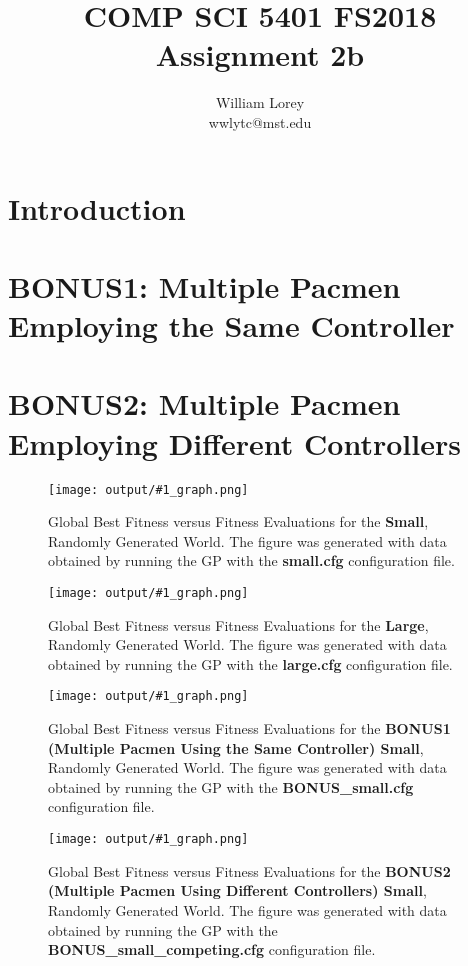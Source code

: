 \documentclass[11pt]{article}
\title{COMP SCI 5401 FS2018 Assignment 2b}
\author{William  Lorey \\ wwlytc@mst.edu}
\date{}
\newcommand{\fitnessplotcaption}[2]{\caption{Global Best Fitness versus Fitness Evaluations for the \textbf{{#1}}, Randomly Generated World. The figure was generated with data obtained by running the GP with the \textbf{{#2}} configuration file.}}
\newcommand{\addgraphic}[1]{\centerline{\texttt{[image: output/\#1\_graph.png]}}}
\begin{document}
\maketitle

\tableofcontents

\section{Introduction}

\section{BONUS1: Multiple Pacmen Employing the Same Controller}

\section{BONUS2: Multiple Pacmen Employing Different Controllers}

\begin{figure}[H]
    \addgraphic{small}
    \fitnessplotcaption{Small}{small.cfg}
    \label{fig:small}
\end{figure}

\begin{figure}[H]
    \addgraphic{large}
    \fitnessplotcaption{Large}{large.cfg}
    \label{fig:med_small}
\end{figure}

\begin{figure}[H]
    \addgraphic{BONUS_small}
    \fitnessplotcaption{BONUS1 (Multiple Pacmen Using the Same Controller) Small}{BONUS\_small.cfg}
    \label{fig:med_large}
\end{figure}

\begin{figure}[H]
    \addgraphic{BONUS_small_competing}
    \fitnessplotcaption{BONUS2 (Multiple Pacmen Using Different Controllers) Small}{BONUS\_small\_competing.cfg}
    \label{fig:large}
\end{figure}
\end{document}
